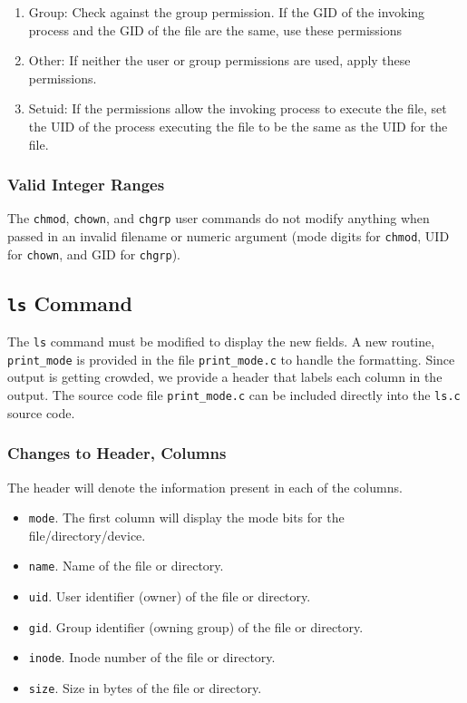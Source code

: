 \documentclass[11pt,letterpaper]{report}
\begin{document}
\begin{enumerate}
\begin{enumerate}
			\item Group: Check against the group permission. If the GID of the invoking process and the GID of the file are the same, use these permissions
			
			\item Other: If neither the user or group permissions are used, apply these permissions.
			
			\item Setuid: If the permissions allow the invoking process to execute the file, set the UID of the process executing the file to be the same as the UID for the file. 
		\end{enumerate}
	
	\end{enumerate}
	
	\subsubsection{Valid Integer Ranges}
	The {\tt chmod}, {\tt chown}, and {\tt chgrp} user commands do not modify anything when passed in an invalid filename or numeric argument (mode digits for {\tt chmod}, UID for {\tt chown}, and GID for {\tt chgrp}).
	
	\subsection{{\tt ls} Command}
	The {\tt ls} command must be modified to display the new fields. A new routine, {\tt print\_mode} is provided in the file {\tt print\_mode.c} to handle the formatting. Since output is getting crowded, we provide a header that labels each column in the output. The source code file {\tt print\_mode.c} can be included directly into the {\tt ls.c} source code.
	
	\subsubsection{Changes to Header, Columns}
	The header will denote the information present in each of the columns.
	\begin{itemize}
		\item[] {\tt mode}. The first column will display the mode bits for the file/directory/device.
		\item[] {\tt name}. Name of the file or directory.
		\item[] {\tt uid}. User identifier (owner) of the file or directory.
		\item[]{\tt gid}. Group identifier (owning group) of the file or directory.
		\item[] {\tt inode}. Inode number of the file or directory.
		\item[] {\tt size}. Size in bytes of the file or directory.
	\end{itemize}
	
\end{document}
